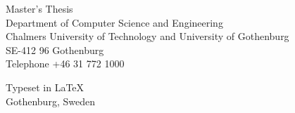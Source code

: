 {Master's Thesis \the\year\\	%
Department of Computer Science and Engineering\\
Chalmers University of Technology and University of Gothenburg\\
SE-412 96 Gothenburg\\
Telephone +46 31 772 1000 \setlength{\parskip}{0.5cm}

\vfill


Typeset in \LaTeX \\
Gothenburg, Sweden \the\year

}